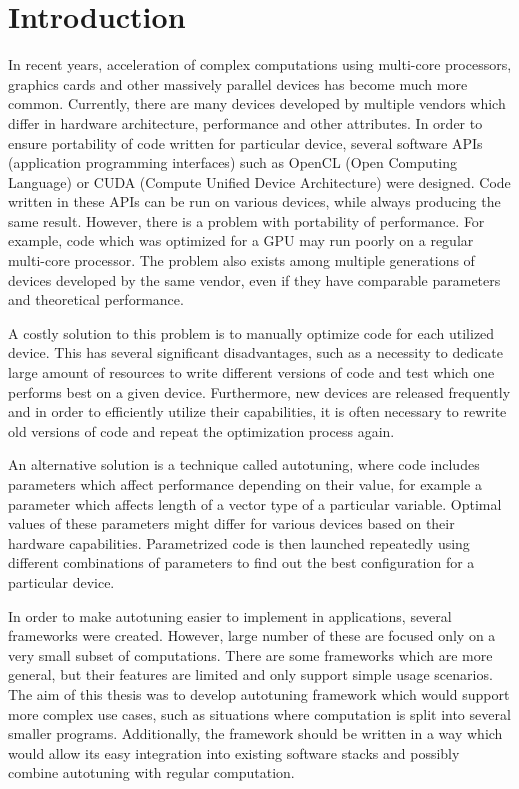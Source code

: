 \documentclass
[
    digital, %
    oneside, %
    table, %
    nolof, %
    nolot, %
    nocover %
]{fithesis3}
\begin{document}
\chapter{Introduction}
In recent years, acceleration of complex computations using multi-core processors, graphics cards and other massively parallel devices has become
much more common. Currently, there are many devices developed by multiple vendors which differ in hardware architecture, performance and other
attributes. In order to ensure portability of code written for particular device, several software APIs (application programming interfaces) such as
OpenCL (Open Computing Language) or CUDA (Compute Unified Device Architecture) were designed. Code written in these APIs can be run on various
devices, while always producing the same result. However, there is a problem with portability of performance. For example, code which was optimized
for a GPU may run poorly on a regular multi-core processor. The problem also exists among multiple generations of devices developed by the same
vendor, even if they have comparable parameters and theoretical performance.

A costly solution to this problem is to manually optimize code for each utilized device. This has several significant disadvantages, such as
a necessity to dedicate large amount of resources to write different versions of code and test which one performs best on a given device. Furthermore,
new devices are released frequently and in order to efficiently utilize their capabilities, it is often necessary to rewrite old versions of code and
repeat the optimization process again.

An alternative solution is a technique called autotuning, where code includes parameters which affect performance depending on their value, for
example a parameter which affects length of a vector type of a particular variable. Optimal values of these parameters might differ for various
devices based on their hardware capabilities. Parametrized code is then launched repeatedly using different combinations of parameters to find out the
best configuration for a particular device.

In order to make autotuning easier to implement in applications, several frameworks were created. However, large number of these are focused
only on a very small subset of computations. There are some frameworks which are more general, but their features are limited and only support
simple usage scenarios. The aim of this thesis was to develop autotuning framework which would support more complex use cases, such as situations
where computation is split into several smaller programs. Additionally, the framework should be written in a way which would allow its easy
integration into existing software stacks and possibly combine autotuning with regular computation.
\end{document}
